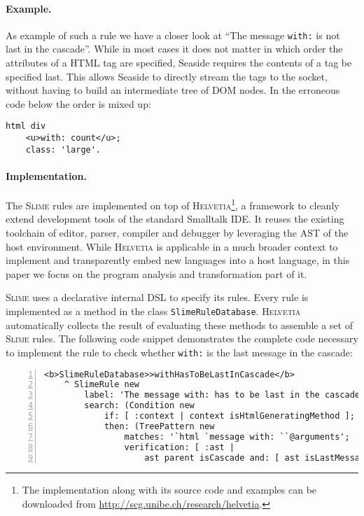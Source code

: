 \documentclass[10pt,twocolumn]{article}
\newcommand{\ct}{\lstinline[backgroundcolor=\color{white}]}
\newcommand{\Slime}{\textsc{Slime}\xspace}
\newcommand{\Seaside}{Seaside\xspace}
\newcommand{\Helvetia}{\textsc{Helvetia}\xspace}
\begin{document}
\paragraph{Example.} As example of such a rule we have a closer look at ``The message \ct{with:} is not last in the cascade''. While in most cases it does not matter in which order the attributes of a HTML tag are specified, \Seaside requires the contents of a tag be specified last. This allows \Seaside to directly stream the tags to the socket, without having to build an intermediate tree of DOM nodes. In the erroneous code below the order is mixed up:

\begin{lstlisting}
html div
	<u>with: count</u>;
	class: 'large'.
\end{lstlisting}

\paragraph{Implementation.} The \Slime rules are implemented on top of \Helvetia\footnote{The implementation along with its source code and examples can be downloaded from \url{http://scg.unibe.ch/research/helvetia}.}, a framework to cleanly extend development tools of the standard Smalltalk IDE. It reuses the existing toolchain of editor, parser, compiler and debugger by leveraging the AST of the host environment. While \Helvetia  is applicable in a much broader context to implement and transparently embed new languages into a host language, in this paper we focus on the program analysis and transformation part of it.

\Slime uses a declarative internal DSL to specify its rules. Every rule is implemented as a method in the class \ct{SlimeRuleDatabase}. \Helvetia automatically collects the result of evaluating these methods to assemble a set of \Slime rules. The following code snippet demonstrates the complete code necessary to implement the rule to check whether \ct{with:} is the last message in the cascade:

\begin{lstlisting}[name=withHasToBeLastInCascade,numbers=left]
<b>SlimeRuleDatabase>>withHasToBeLastInCascade</b>
	^ SlimeRule new
		label: 'The message with: has to be last in the cascade';
		search: (Condition new
			if: [ :context | context isHtmlGeneratingMethod ];
			then: (TreePattern new
				matches: '`html `message with: ``@arguments';
				verification: [ :ast | 
					ast parent isCascade and: [ ast isLastMessage not ] ]));
\end{lstlisting}
\end{document}
